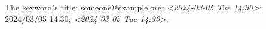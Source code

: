 The keyword's title; someone@example.org; \textit{<2024-03-05 Tue 14:30>}; 2024/03/05 14:30; \textit{<2024-03-05 Tue 14:30>}.
